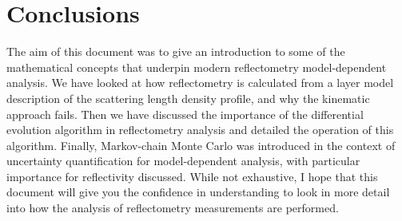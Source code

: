 \documentclass[twoside,symmetric]{tufte-handout}
\begin{document}
\section{Conclusions}

The aim of this document was to give an introduction to some of the mathematical concepts that underpin modern reflectometry model-dependent analysis. 
We have looked at how reflectometry is calculated from a layer model description of the scattering length density profile, and why the kinematic approach fails. 
Then we have discussed the importance of the differential evolution algorithm in reflectometry analysis and detailed the operation of this algorithm. 
Finally, Markov-chain Monte Carlo was introduced in the context of uncertainty quantification for model-dependent analysis, with particular importance for reflectivity discussed. 
While not exhaustive, I hope that this document will give you the confidence in understanding to look in more detail into how the analysis of reflectometry measurements are performed.




\end{document}
